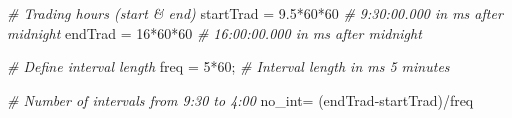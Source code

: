 \documentclass[
  oneside]{book}
\newenvironment{Shaded}{\begin{snugshade}}{\end{snugshade}}
\newcommand{\CommentTok}[1]{\textcolor[rgb]{0.56,0.35,0.01}{\textit{#1}}}
\newcommand{\DecValTok}[1]{\textcolor[rgb]{0.00,0.00,0.81}{#1}}
\newcommand{\FloatTok}[1]{\textcolor[rgb]{0.00,0.00,0.81}{#1}}
\newcommand{\NormalTok}[1]{#1}
\newcommand{\OtherTok}[1]{\textcolor[rgb]{0.56,0.35,0.01}{#1}}
\newcommand{\SpecialCharTok}[1]{\textcolor[rgb]{0.00,0.00,0.00}{#1}}
\begin{document}
\begin{Shaded}
\begin{Highlighting}[]
\CommentTok{\# Trading hours (start \& end)}
\NormalTok{startTrad }\OtherTok{=} \FloatTok{9.5}\SpecialCharTok{*}\DecValTok{60}\SpecialCharTok{*}\DecValTok{60}       \CommentTok{\# 9:30:00.000 in ms after midnight}
\NormalTok{endTrad }\OtherTok{=} \DecValTok{16}\SpecialCharTok{*}\DecValTok{60}\SpecialCharTok{*}\DecValTok{60}        \CommentTok{\# 16:00:00.000 in ms after midnight}

\CommentTok{\# Define interval length}
\NormalTok{freq }\OtherTok{=} \DecValTok{5}\SpecialCharTok{*}\DecValTok{60}\NormalTok{;   }\CommentTok{\# Interval length in ms 5 minutes}

\CommentTok{\# Number of intervals from 9:30 to 4:00}
\NormalTok{no\_int}\OtherTok{=}\NormalTok{ (endTrad}\SpecialCharTok{{-}}\NormalTok{startTrad)}\SpecialCharTok{/}\NormalTok{freq}
\end{Highlighting}
\end{Shaded}
\end{document}
